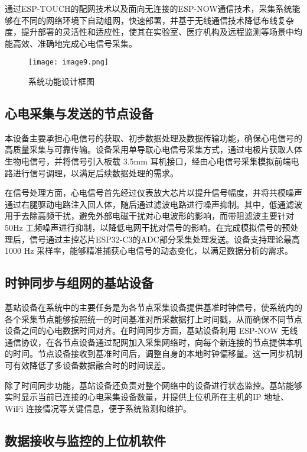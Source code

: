 通过ESP-TOUCH的配网技术以及面向无连接的ESP-NOW通信技术，采集系统能够在不同的网络环境下自动组网，快速部署，并基于无线通信技术降低布线复杂度，提升部署的灵活性和适应性，使其在实验室、医疗机构及远程监测等场景中均能高效、准确地完成心电信号采集。

\begin{figure}[hbt]
    \centering
    \texttt{[image: image9.png]}
    \caption{系统功能设计框图}
    \label{F.ECG_image9}
\end{figure}

\subsection{心电采集与发送的节点设备}

本设备主要承担心电信号的获取、初步数据处理及数据传输功能，确保心电信号的高质量采集与可靠传输。设备采用单导联心电信号采集方式，通过电极片获取人体生物电信号，并将信号引入板载 3.5mm 耳机接口，经由心电信号采集模拟前端电路进行信号调理，以满足后续数据处理的需求。

在信号处理方面，心电信号首先经过仪表放大芯片以提升信号幅度，并将共模噪声通过右腿驱动电路注入回人体，随后通过滤波电路进行噪声抑制。其中，低通滤波用于去除高频干扰，避免外部电磁干扰对心电波形的影响，而带阻滤波主要针对 50Hz 工频噪声进行抑制，以降低电网干扰对信号的影响。在完成模拟信号的预处理后，信号通过主控芯片ESP32-C3的ADC部分采集处理发送。设备支持理论最高 1000 Hz 采样率，能够精准捕获心电信号的动态变化，以满足数据分析的需求。

\subsection{时钟同步与组网的基站设备}

基站设备在系统中的主要任务是为各节点采集设备提供基准时钟信号，使系统内的各个采集节点能够按照统一的时间基准对所采数据打上时间戳，从而确保不同节点设备之间的心电数据时间对齐。在时间同步方面，基站设备利用 ESP-NOW 无线通信协议，在各节点设备通过配网加入采集网络时，向每个新连接的节点提供本机的时间。节点设备接收到基准时间后，调整自身的本地时钟偏移量。这一同步机制可有效降低了多设备数据融合时的时间误差。

除了时间同步功能，基站设备还负责对整个网络中的设备进行状态监控。基站能够实时显示当前已连接的心电采集设备数量，并提供上位机所在主机的IP 地址、WiFi 连接情况等关键信息，便于系统监测和维护。

\subsection{数据接收与监控的上位机软件}

